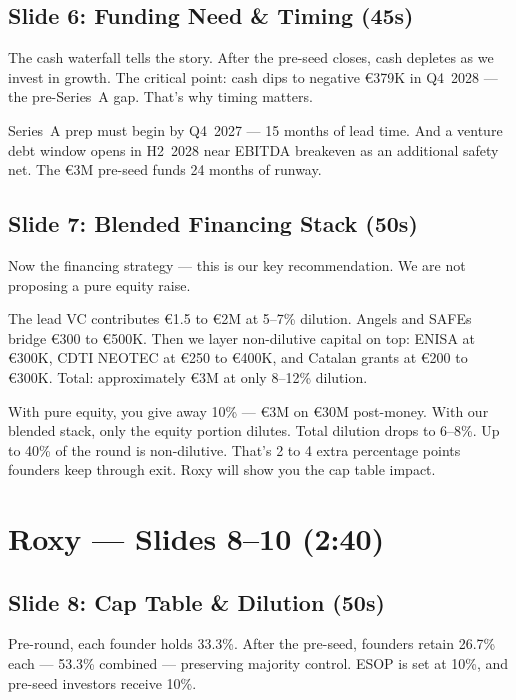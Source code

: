 \documentclass[11pt,a4paper]{article}
\begin{document}
\subsection{Slide 6: Funding Need \& Timing (\texttildelow45s)}

The cash waterfall tells the story. After the pre-seed closes, cash depletes as we invest in growth. The critical point: cash dips to negative \euro{}379K in Q4~2028 --- the pre-Series~A gap. That's why timing matters.

Series~A prep must begin by Q4~2027 --- 15 months of lead time. And a venture debt window opens in H2~2028 near EBITDA breakeven as an additional safety net. The \euro{}3M pre-seed funds 24 months of runway.

\subsection{Slide 7: Blended Financing Stack (\texttildelow50s)}

Now the financing strategy --- this is our key recommendation. We are not proposing a pure equity raise.

The lead VC contributes \euro{}1.5 to \euro{}2M at 5--7\% dilution. Angels and SAFEs bridge \euro{}300 to \euro{}500K. Then we layer non-dilutive capital on top: ENISA at \euro{}300K, CDTI NEOTEC at \euro{}250 to \euro{}400K, and Catalan grants at \euro{}200 to \euro{}300K. Total: approximately \euro{}3M at only 8--12\% dilution.

With pure equity, you give away 10\% --- \euro{}3M on \euro{}30M post-money. With our blended stack, only the equity portion dilutes. Total dilution drops to 6--8\%. Up to 40\% of the round is non-dilutive. That's 2 to 4 extra percentage points founders keep through exit. Roxy will show you the cap table impact.

\section{Roxy --- Slides 8--10 (2:40)}

\subsection{Slide 8: Cap Table \& Dilution (\texttildelow50s)}

Pre-round, each founder holds 33.3\%. After the pre-seed, founders retain 26.7\% each --- 53.3\% combined --- preserving majority control. ESOP is set at 10\%, and pre-seed investors receive 10\%.
\end{document}
